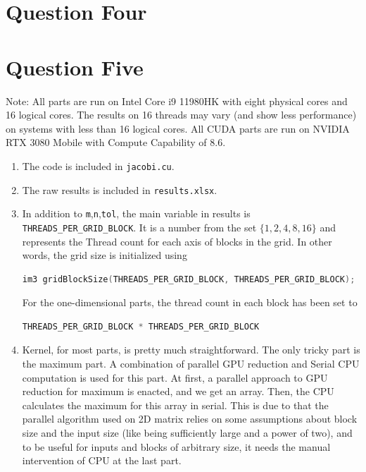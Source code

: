 \documentclass[12pt]{article}
\begin{document}
\newpage

\section{Question Four}



\newpage

\section{Question Five}

Note: All parts are run on Intel Core i9 11980HK with eight physical cores and 16 logical cores. The results on 16 threads may vary (and show less performance) on systems with less than 16 logical cores. All CUDA parts are run on NVIDIA RTX 3080 Mobile with Compute Capability of 8.6.

\begin{enumerate}[label=]
	
	\item 
	The code is included in \Verb+jacobi.cu+.
	
	\item 
	The raw results is included in \Verb+results.xlsx+.
	
	
	\item 
	In addition to \Verb+m+,\Verb+n+,\Verb+tol+, the main variable in results is \Verb+THREADS_PER_GRID_BLOCK+. It is a number from the set $\{1,2,4,8,16\}$ and represents the Thread count for each axis of blocks in the grid. In other words, the grid size is initialized using
	
	\begin{lstlisting}[language=c++]
		im3 gridBlockSize(THREADS_PER_GRID_BLOCK, THREADS_PER_GRID_BLOCK);
	\end{lstlisting}
	
	For the one-dimensional parts, the thread count in each block has been set to
	\begin{lstlisting}[language=c++]
		THREADS_PER_GRID_BLOCK * THREADS_PER_GRID_BLOCK
	\end{lstlisting}
	
	
	\item 
	Kernel, for most parts, is pretty much straightforward. The only tricky part is the maximum part. A combination of parallel GPU reduction and Serial CPU computation is used for this part. At first, a parallel approach to GPU reduction for maximum is enacted, and we get an array. Then, the CPU calculates the maximum for this array in serial. This is due to that the parallel algorithm used on 2D matrix relies on some assumptions about block size and the input size (like being sufficiently large and a power of two), and to be useful for inputs and blocks of arbitrary size, it needs the manual intervention of CPU at the last part.
	
	
	
	
	
\end{enumerate}
\end{document}

